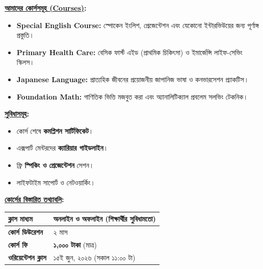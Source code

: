 \documentclass[a4paper,11pt]{article}
\begin{document}
\noindent
\begin{minipage}[t]{0.55\textwidth}
    \textcolor{primary}{\textbf{\Large \underline{আমাদের কোর্সসমূহ {\englishfont (Courses)}}:}}
    \vspace{0.3cm}
    \begin{itemize}[label=\textcolor{secondary}{$\blacksquare$}, itemsep=2pt, leftmargin=*]
        \item {\englishfont \textbf{Special English Course:}} স্পোকেন ইংলিশ, প্রেজেন্টেশন এবং যেকোনো ইন্টারভিউয়ের জন্য পূর্ণাঙ্গ প্রস্তুতি।
        \item {\englishfont \textbf{Primary Health Care:}} বেসিক ফার্স্ট এইড (প্রাথমিক চিকিৎসা) ও ইমার্জেন্সি লাইফ-সেভিং স্কিলস।
        \item {\englishfont \textbf{Japanese Language:}} প্রাত্যহিক জীবনের প্রয়োজনীয় জাপানিজ ভাষা ও কনভারসেশন প্র্যাকটিস।
        \item {\englishfont \textbf{Foundation Math:}} গাণিতিক ভিত্তি মজবুত করা এবং অ্যানালিটিক্যাল প্রবলেম সলভিং টেকনিক।
    \end{itemize}
\end{minipage}
\hfill
\begin{minipage}[t]{0.40\textwidth}
    \textcolor{primary}{\textbf{\Large \underline{সুবিধাসমূহ}:}}
    \vspace{0.3cm}
    \begin{itemize}[label=\textcolor{accent}{$\checkmark$}, itemsep=5pt, leftmargin=*]
        \item কোর্স শেষে \textbf{কমপ্লিশন সার্টিফিকেট}।
        \item এক্সপার্ট মেন্টরদের \textbf{ক্যারিয়ার গাইডলাইন}।
        \item ফ্রি \textbf{স্পিকিং ও প্রেজেন্টেশন} সেশন।
        \item লাইফটাইম সাপোর্ট ও নেটওয়ার্কিং।
    \end{itemize}
\end{minipage}

\vspace{0.6cm}

\noindent \textcolor{primary}{\textbf{\Large \underline{কোর্সের বিস্তারিত তথ্যাবলি}:}}
\vspace{0.3cm}
\begin{table}[h]
    \centering
    \renewcommand{\arraystretch}{1.5}
    \begin{tabularx}{\textwidth}{|>{\raggedright\arraybackslash\bfseries}p{3cm}|X|}
        \hline
        \textcolor{primary}{ক্লাস মাধ্যম} & অনলাইন ও অফলাইন (শিক্ষার্থীর সুবিধামতো) \\
        \hline
        \textcolor{primary}{কোর্স ডিউরেশন} & ২ মাস \\
        \hline
        \textcolor{primary}{কোর্স ফি} & \textbf{১,০০০ টাকা} (মাত্র) \\
        \hline
        \textcolor{primary}{ওরিয়েন্টেশন ক্লাস} & ১৫ই জুন, ২০২৬ (সকাল ১১:০০ টা) \\
        \hline
    \end{tabularx}
\end{table}
\end{document}
